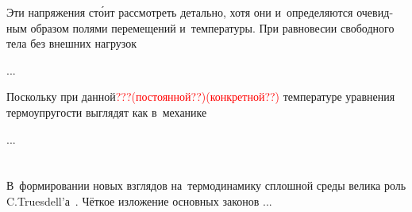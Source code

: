 
\begin{otherlanguage}{russian}

Эти напряжения ст\'{о}ит рассмотреть детально, хотя они и~определяются очевидным образом полями перемещений и~температуры. При равновесии свободного тела без внешних нагрузок

...



\end{otherlanguage}



\begin{otherlanguage}{russian}

Поскольку при данной\textcolor{red}{???(постоянной??)(конкретной??)} температуре уравнения термоупругости выглядят как в~механике

...



\end{otherlanguage}

\vspace{8mm}
\hfill\begin{minipage}[b]{0.95\linewidth}
\fontsize{10}{12}\selectfont

\section*{\wordforbibliography}

\begin{otherlanguage}{russian}

В~формировании новых взглядов на~термодинамику сплошной среды велика роль C.\:Truesdell’а~\cite{truesdell-firstcourse}. Чёткое изложение основных законов ...

\end{otherlanguage}

\end{minipage}
